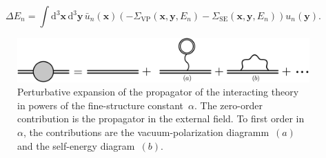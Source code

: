 \begin{equation}
\Delta E_n = \int \text{d}^3\mathbf{x}\,\text{d}^3\mathbf{y}\,\bar{u}_n(\mathbf{x})\left( -\Sigma_{\text{VP}}(\mathbf{x},\mathbf{y},E_n)-\Sigma_{\text{SE}}(\mathbf{x},\mathbf{y},E_n) \right)u_n(\mathbf{y}).
\end{equation}
%
\begin{figure}%
\centering
\includegraphics[width=0.9\linewidth]{pics/1loop.pdf}%
\caption{Perturbative expansion of the propagator of the interacting theory in powers of the fine-structure constant~$\alpha$. The zero-order contribution is the propagator in the external field. To first order in~$\alpha$, the contributions are the vacuum-polarization diagramm~$(a)$ and the self-energy diagram~$(b)$.}%
\label{fig:1loop}%
\end{figure}
%

